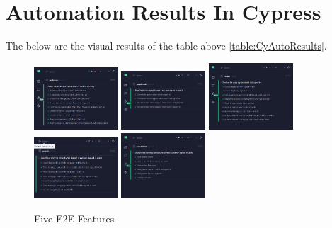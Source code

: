 \section{Automation Results In Cypress}
The below are the visual results of the table above \ref{table:CyAutoResults}.
\begin{figure}
        \centering
        \includegraphics[width=0.28\textwidth]{images/authFormF}
        \hfill
        \includegraphics[width=0.28\textwidth]{images/pageDetailsF}
        \hfill
        \includegraphics[width=0.28\textwidth]{images/RoutesF}
        \hfill
        \includegraphics[width=0.28\textwidth]{images/SearchF}
        \hfill
        \includegraphics[width=0.28\textwidth]{images/UserActionsF}
        \caption{Five E2E Features}
\end{figure}

